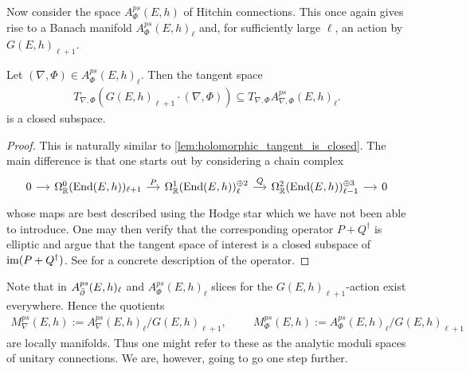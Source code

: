 \documentclass[12pt]{ociamthesis}  %
\begin{document}
Now consider the space $A_\Phi^{ps}(E,h)$ of Hitchin connections.
This once again gives rise to a Banach manifold $A_\Phi^{ps}(E,h)_\ell$
and, for sufficiently large $\ell$, an action by $G(E,h)_{\ell+1}$.

\begin{lemma}
  Let $(\nabla,\Phi)\in A_\Phi^{ps}(E,h)_\ell$. Then the tangent space
  \begin{align*}
    T_{\nabla,\Phi}(G(E,h)_{\ell+1}\cdot(\nabla,\Phi))
    \subseteq T_{\nabla,\Phi}A_{\nabla,\Phi}^{ps}(E,h)_\ell.
  \end{align*}
  is a closed subspace.
  \begin{proof}
    This is naturally similar to \ref{lem:holomorphic_tangent_is_closed}.
    The main difference is that one starts out by considering a chain
    complex
    \begin{equation*}
      \begin{tikzcd}[column sep=small]
        0 & {\Omega^0_{\mathbb R}(\End(E,h))_{\ell+1}} & {\Omega^1_{\mathbb R}(\End(E,h))^{\oplus 2}_\ell} & {\Omega^2_{\mathbb R}(\End(E,h))^{\oplus 3}_{\ell-1}} & 0
        \arrow[from=1-1, to=1-2]
        \arrow["P", from=1-2, to=1-3]
        \arrow["Q", from=1-3, to=1-4]
        \arrow[from=1-4, to=1-5]
      \end{tikzcd}
    \end{equation*}
    whose maps are best described using the Hodge star which we have
    not been able to introduce. One may then
    verify that the corresponding operator $P+Q^\dagger$ is elliptic
    and argue that the tangent space of interest is a closed subspace
    of $\operatorname{im}(P+Q^\dagger)$. See \cite[98]{neitzke2021} for a concrete
    description of the operator.
  \end{proof}
\end{lemma}

Note that in $A^{ps}_{\bar{\partial}}(E,h)_\ell$ and $A^{ps}_\Phi(E,h)_\ell$ slices for the
$G(E,h)_{\ell+1}$-action exist everywhere. Hence the quotients
\begin{align*}
  M^{ps}_\nabla(E,h) := A^{ps}_\nabla(E,h)_\ell / G(E,h)_{\ell+1},\hspace{1cm}
  M^{ps}_\Phi(E,h) := A^{ps}_\Phi(E,h)_\ell / G(E,h)_{\ell+1}
\end{align*}
are locally manifolds. Thus one might refer to these as the analytic
moduli spaces of unitary connections. We are, however, going to go
one step further.
\end{document}

